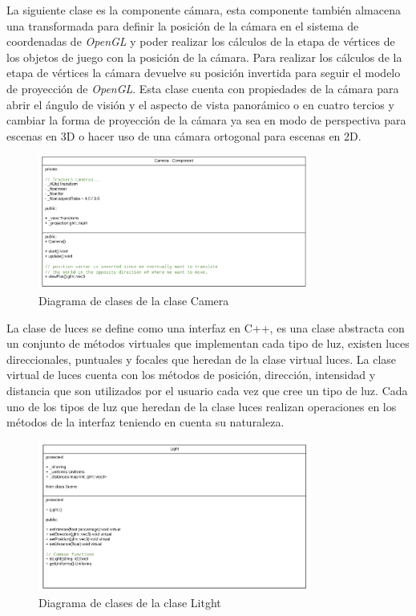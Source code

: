 \documentclass[a4paper]{book}
\begin{document}
La siguiente clase es la componente cámara, esta componente también almacena una transformada para definir la posición de la cámara en el
sistema de coordenadas de \textit{OpenGL} y poder realizar los cálculos de la etapa de vértices de los objetos de juego con la posición de la cámara.
Para realizar los cálculos de la etapa de vértices la cámara devuelve su posición invertida para seguir el modelo de proyección de \textit{OpenGL}. 
Esta clase cuenta con propiedades de la cámara para abrir el ángulo de visión y el aspecto de vista panorámico o en cuatro tercios y cambiar
la forma de proyección de la cámara ya sea en modo de perspectiva para escenas en 3D o hacer uso de una cámara ortogonal para escenas en 2D.

\begin{figure}[H]
    \centering
    \includegraphics[width=9cm, keepaspectratio]{img/Camera.png}
    \caption{Diagrama de clases de la clase Camera}
    \label{Camera}
\end{figure}

La clase de luces se define como una interfaz en C++, es una clase abstracta con un conjunto de métodos virtuales que implementan cada
tipo de luz, existen luces direccionales, puntuales y focales que heredan de la clase virtual luces. La clase virtual de luces cuenta con
los métodos de posición, dirección, intensidad y distancia que son utilizados por el usuario cada vez que cree un tipo de luz. Cada uno de los
tipos de luz que heredan de la clase luces realizan operaciones en los métodos de la interfaz teniendo en cuenta su naturaleza.

\begin{figure}[H]
    \centering
    \includegraphics[width=9cm, keepaspectratio]{img/Litght.png}
    \caption{Diagrama de clases de la clase Litght}
    \label{Litght}
\end{figure}
\end{document}
